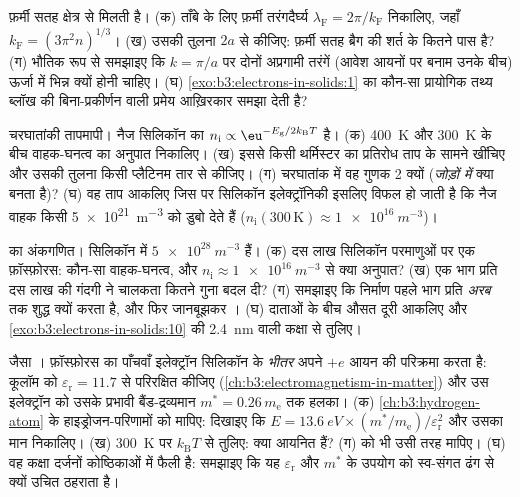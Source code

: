 \begin{exercise}[$\star\star$]\label{exo:b3:electrons-in-solids:7}
फ़र्मी सतह क्षेत्र से मिलती है। (क) ताँबे के लिए फ़र्मी
तरंगदैर्घ्य $\lambda_{\text{F}} = 2\pi/k_{\text{F}}$ निकालिए, जहाँ
$k_{\text{F}} = (3\pi^2n)^{1/3}$। (ख) उसकी तुलना $2a$ से कीजिए:
फ़र्मी सतह ब्रैग की शर्त के कितने पास है? (ग) भौतिक रूप से समझाइए कि
$k = \pi/a$ पर दोनों अप्रगामी तरंगें (आवेश आयनों पर बनाम उनके बीच)
ऊर्जा में भिन्न क्यों होनी चाहिए। (घ)
\cref{exo:b3:electrons-in-solids:1} का कौन-सा प्रायोगिक तथ्य
ब्लॉख की बिना-प्रकीर्णन वाली प्रमेय आख़िरकार समझा देती है?
\end{exercise}

\begin{exercise}[$\star\star$]\label{exo:b3:electrons-in-solids:8}
चरघातांकी तापमापी। नैज सिलिकॉन का $n_{\text{i}}
\propto \eu^{-E_{\text{g}}/2k_{\text{B}}T}$ है। (क)
\qty{400}{K} और \qty{300}{K} के बीच वाहक-घनत्व का अनुपात निकालिए। (ख)
इससे किसी थर्मिस्टर का प्रतिरोध ताप के सामने खींचिए और
उसकी तुलना किसी प्लैटिनम तार से कीजिए। (ग) चरघातांक में वह गुणक 2
क्यों (\emph{जोड़ों में} क्या बनता है)? (घ) वह ताप आकलिए जिस पर
सिलिकॉन इलेक्ट्रॉनिकी इसलिए विफल हो जाती है कि नैज
वाहक किसी \qty{5e21}{m^{-3}}  को डुबो देते हैं
($n_{\text{i}}(300\,\text{K}) \approx \qty{1e16}{m^{-3}}$)।
\end{exercise}

\begin{exercise}[$\star\star$]\label{exo:b3:electrons-in-solids:9}
 का अंकगणित। सिलिकॉन में $\qty{5e28}{m^{-3}}$ हैं। (क)
दस लाख सिलिकॉन परमाणुओं पर एक फ़ॉस्फ़ोरस: कौन-सा वाहक-घनत्व, और
$n_{\text{i}} \approx \qty{1e16}{m^{-3}}$ से क्या अनुपात? (ख) एक
भाग प्रति दस लाख की गंदगी ने चालकता कितने गुना बदल दी? (ग)
समझाइए कि  निर्माण पहले भाग प्रति \emph{अरब} तक शुद्ध
क्यों करता है, और फिर जानबूझकर । (घ) दाताओं के बीच
औसत दूरी आकलिए और \cref{exo:b3:electrons-in-solids:10} की
\qty{2.4}{nm} वाली कक्षा से तुलिए।
\end{exercise}

\begin{exercise}[$\star\star\star$]\label{exo:b3:electrons-in-solids:10}
 जैसा । फ़ॉस्फ़ोरस का पाँचवाँ इलेक्ट्रॉन
सिलिकॉन के \emph{भीतर} अपने $+e$ आयन की परिक्रमा करता है: कूलॉम को
$\varepsilon_{\text{r}} = 11.7$ से परिरक्षित कीजिए
(\cref{ch:b3:electromagnetism-in-matter}) और उस इलेक्ट्रॉन को
उसके प्रभावी बैंड-द्रव्यमान $m^* = 0.26\,m_{\text{e}}$ तक हलका।
(क) \cref{ch:b3:hydrogen-atom} के हाइड्रोजन-परिणामों को मापिए:
दिखाइए कि $E = \qty{13.6}{eV}\times(m^*/m_{\text{e}})/
\varepsilon_{\text{r}}^2$ और उसका मान निकालिए। (ख) \qty{300}{K} पर
$k_{\text{B}}T$ से तुलिए: क्या  आयनित हैं? (ग)
 को भी उसी तरह मापिए। (घ) वह कक्षा दर्जनों
 कोष्ठिकाओं में फैली है: समझाइए कि यह $\varepsilon_{\text{r}}$
और $m^*$ के उपयोग को स्व-संगत ढंग से क्यों उचित ठहराता है।
\end{exercise}

